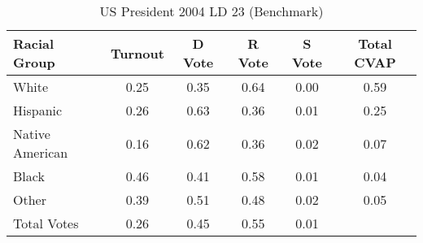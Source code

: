 \begin{table}[htb]
\begin{center}
\caption{US President 2004 LD 23 (Benchmark)}
\label{pres04_cvap_ld_23_benchmark}
\begin{tabular}{lccccc}
  \hline
Racial Group & Turnout & D Vote & R Vote & S Vote & Total CVAP \\ 
  \hline
White & 0.25 & 0.35 & 0.64 & 0.00 & 0.59 \\ 
  Hispanic & 0.26 & 0.63 & 0.36 & 0.01 & 0.25 \\ 
  Native American & 0.16 & 0.62 & 0.36 & 0.02 & 0.07 \\ 
  Black & 0.46 & 0.41 & 0.58 & 0.01 & 0.04 \\ 
  Other & 0.39 & 0.51 & 0.48 & 0.02 & 0.05 \\ 
  Total Votes & 0.26 & 0.45 & 0.55 & 0.01 &  \\ 
   \hline
\end{tabular}
\end{center}
\end{table}
